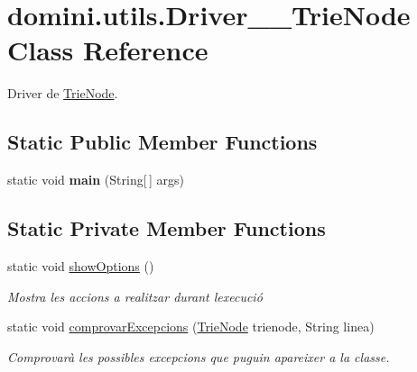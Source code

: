\hypertarget{classdomini_1_1utils_1_1Driver____TrieNode}{}\section{domini.\+utils.\+Driver\+\_\+\+\_\+\+Trie\+Node Class Reference}
\label{classdomini_1_1utils_1_1Driver____TrieNode}


Driver de \hyperlink{classdomini_1_1utils_1_1TrieNode}{Trie\+Node}.  


\subsection*{Static Public Member Functions}
\begin{DoxyCompactItemize}
\item 
\mbox{\label{classdomini_1_1utils_1_1Driver____TrieNode_a19cb816408fb6b32cca0ea8ae8bc4153}} 
static void {\bfseries main} (String\mbox{[}$\,$\mbox{]} args)
\end{DoxyCompactItemize}
\subsection*{Static Private Member Functions}
\begin{DoxyCompactItemize}
\item 
\mbox{\label{classdomini_1_1utils_1_1Driver____TrieNode_ab9e971ebb4f8e219efaab32c6654243a}} 
static void \hyperlink{classdomini_1_1utils_1_1Driver____TrieNode_ab9e971ebb4f8e219efaab32c6654243a}{show\+Options} ()
\begin{DoxyCompactList}\small\item\em Mostra les accions a realitzar durant l\textquotesingle{}execució \end{DoxyCompactList}\item 
static void \hyperlink{classdomini_1_1utils_1_1Driver____TrieNode_a283501ee0ecd67255b0a4a8c0404a07a}{comprovar\+Excepcions} (\hyperlink{classdomini_1_1utils_1_1TrieNode}{Trie\+Node} trienode, String linea)
\begin{DoxyCompactList}\small\item\em Comprovarà les possibles excepcions que puguin apareixer a la classe. \end{DoxyCompactList}\end{DoxyCompactItemize}


